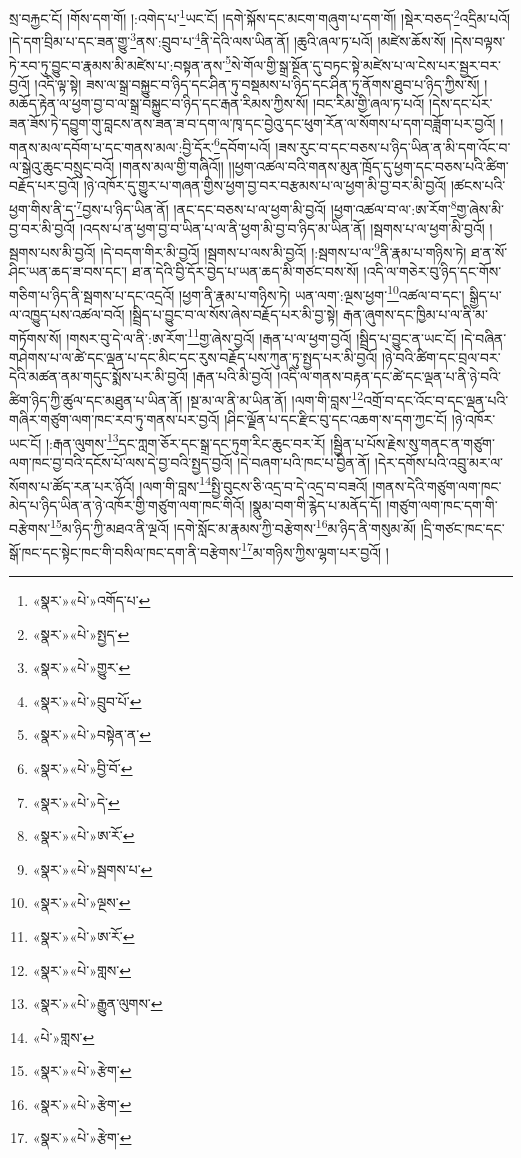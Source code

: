 སྲ་བརྐྱང་ངོ། །གོས་དག་གོ། །:འགེད་པ་\footnote{«སྣར་»«པེ་»འགོད་པ་}ཡང་ངོ། །དགེ་སྐོས་དང་མངག་གཞུག་པ་དག་གོ། །སྡེར་བཅད་\footnote{«སྣར་»«པེ་»སྤྱད་}འདྲིམ་པའོ། །དེ་དག་བྲིམ་པ་དང་ཟན་གྱུ་\footnote{«སྣར་»«པེ་»གྱུར་}ནས་:བྲུབ་པ་\footnote{«སྣར་»«པེ་»བྲུབ་པོ་}ནི་དེའི་ལས་ཡིན་ནོ། །ཆུའི་ཞལ་ཏ་པའོ། །མཛེས་ཆོས་སོ། །དེས་བལྟས་ཏེ་རབ་ཏུ་བྱུང་བ་རྣམས་མི་མཛེས་པ་:བསྟན་ནས་\footnote{«སྣར་»«པེ་»བསྟེན་ན་}སེ་གོལ་གྱི་སྒྲ་སྔོན་དུ་བཏང་སྟེ་མཛེས་པ་ལ་ངེས་པར་སྦྱར་བར་བྱའོ། །འདི་ལྟ་སྟེ། ཟས་ལ་སྒྲ་བསྐྱུང་བ་ཉིད་དང་ཤིན་ཏུ་བསྡམས་པ་ཉིད་དང་ཤིན་ཏུ་ནོགས་ཐུབ་པ་ཉིད་ཀྱིས་སོ། །མཆོད་རྟེན་ལ་ཕྱག་བྱ་བ་ལ་སྒྲ་བསྐྱུང་བ་ཉིད་དང་རྒན་རིམས་ཀྱིས་སོ། །བང་རིམ་གྱི་ཞལ་ཏ་པའོ། །དེས་དང་པོར་ཟན་ཟོས་ཏེ་དབྱུག་གུ་བླངས་ནས་ཟན་ཟ་བ་དག་ལ་ཁྭ་དང་བྱེའུ་དང་ཕུག་རོན་ལ་སོགས་པ་དག་བཟློག་པར་བྱའོ། །གནས་མལ་དབོག་པ་དང་གནས་མལ་:བྱི་དོར་\footnote{«སྣར་»«པེ་»བྱི་བོ་}དབོག་པའོ། །ཟས་རུང་བ་དང་བཅས་པ་ཉིད་ཡིན་ན་མི་དག་འོང་བ་ལ་སྒེའུ་ཆུང་བསྲུང་བའོ། །གནས་མལ་གྱི་གཞིའོ།། །།ཕྱག་འཚལ་བའི་གནས་མུན་ཁྲོད་དུ་ཕྱག་དང་བཅས་པའི་ཚིག་བརྗོད་པར་བྱའོ། །ཉེ་འཁོར་དུ་གྱུར་པ་གཞན་གྱིས་ཕྱག་བྱ་བར་བརྩམས་པ་ལ་ཕྱག་མི་བྱ་བར་མི་བྱའོ། །ཚངས་པའི་ཕྱག་གིས་ནི་ད་\footnote{«སྣར་»«པེ་»དེ་}བྱས་པ་ཉིད་ཡིན་ནོ། །ནང་དང་བཅས་པ་ལ་ཕྱག་མི་བྱའོ། །ཕྱག་འཚལ་བ་ལ་:ཨ་རོག་\footnote{«སྣར་»«པེ་»ཨ་རོ་}གྱ་ཞེས་མི་བྱ་བར་མི་བྱའོ། །འདས་པ་ན་ཕྱག་བྱ་བ་ཡིན་པ་ལ་ནི་ཕྱག་མི་བྱ་བ་ཉིད་མ་ཡིན་ནོ། །སྦགས་པ་ལ་ཕྱག་མི་བྱའོ། །སྦགས་པས་མི་བྱའོ། །དེ་བདག་གིར་མི་བྱའོ། །སྦགས་པ་ལས་མི་བྱའོ། །:སྦགས་པ་ལ་\footnote{«སྣར་»«པེ་»སྦགས་པ་}ནི་རྣམ་པ་གཉིས་ཏེ། ཐ་ན་སོ་ཤིང་ཡན་ཆད་ཟ་བས་དང་། ཐ་ན་དེའི་བྱི་དོར་བྱེད་པ་ཡན་ཆད་མི་གཙང་བས་སོ། །འདི་ལ་གཅེར་བུ་ཉིད་དང་གོས་གཅིག་པ་ཉིད་ནི་སྦགས་པ་དང་འདྲའོ། །ཕྱག་ནི་རྣམ་པ་གཉིས་ཏེ། ཡན་ལག་:ལྔས་ཕྱག་\footnote{«སྣར་»«པེ་»ལྔས་}འཚལ་བ་དང་། སྒྱིད་པ་ལ་འཁྱུད་པས་འཚལ་བའོ། །སྦྲིད་པ་བྱུང་བ་ལ་སོས་ཞེས་བརྗོད་པར་མི་བྱ་སྟེ། རྒན་ཞུགས་དང་ཁྱིམ་པ་ལ་ནི་མ་གཏོགས་སོ། །གསར་བུ་དེ་ལ་ནི་:ཨ་རོག་\footnote{«སྣར་»«པེ་»ཨ་རོ་}གྱ་ཞེས་བྱའོ། །རྒན་པ་ལ་ཕྱག་བྱའོ། །སྦྲིད་པ་བྱུང་ན་ཡང་ངོ། །དེ་བཞིན་གཤེགས་པ་ལ་ཚེ་དང་ལྡན་པ་དང་མིང་དང་རུས་བརྗོད་པས་ཀུན་ཏུ་སྤྱད་པར་མི་བྱའོ། །ཉེ་བའི་ཚིག་དང་བྲལ་བར་དེའི་མཚན་ནམ་གདུང་སྨོས་པར་མི་བྱའོ། །རྒན་པའི་མི་བྱའོ། །འདི་ལ་གནས་བརྟན་དང་ཚེ་དང་ལྡན་པ་ནི་ཉེ་བའི་ཚིག་ཉིད་ཀྱི་ཚུལ་དང་མཐུན་པ་ཡིན་ནོ། །སྔ་མ་ལ་ནི་མ་ཡིན་ནོ། །ལག་གི་བླས་\footnote{«སྣར་»«པེ་»གླས་}འགྲོ་བ་དང་འོང་བ་དང་ལྡན་པའི་གཞིར་གཙུག་ལག་ཁང་རབ་ཏུ་གནས་པར་བྱའོ། །ཤིང་ལྗོན་པ་དང་རྫིང་བུ་དང་འཆག་ས་དག་ཀྱང་ངོ། །ཉེ་འཁོར་ཡང་ངོ། །:རྒན་ལུགས་\footnote{«སྣར་»«པེ་»རྒྱུན་ལུགས་}དང་ཀླག་ཅོར་དང་སྒྲ་དང་ཏུག་རིང་ཆུང་བར་རོ། །སྦྱིན་པ་པོས་རྗེས་སུ་གནང་ན་གཙུག་ལག་ཁང་བྱ་བའི་དངོས་པོ་ལས་དེ་བྱ་བའི་སྤྱད་བྱའོ། །དེ་བཞག་པའི་ཁང་པ་བྱིན་ནོ། །དེར་དགོས་པའི་འབྲུ་མར་ལ་སོགས་པ་ཚོད་རན་པར་ཉོའོ། །ལག་གི་བླས་\footnote{«པེ་»གླས་}སྤྱི་བུངས་ཅི་འདྲ་བ་དེ་འདྲ་བ་བཟའོ། །གནས་དེའི་གཙུག་ལག་ཁང་མེད་པ་ཉིད་ཡིན་ན་ཉེ་འཁོར་གྱི་གཙུག་ལག་ཁང་གིའོ། །སྣུམ་བག་གི་རྙེད་པ་མནོད་དོ། །གཙུག་ལག་ཁང་དག་གི་བརྩེགས་\footnote{«སྣར་»«པེ་»རྩེག་}མ་ཉིད་ཀྱི་མཐའ་ནི་ལྔའོ། །དགེ་སློང་མ་རྣམས་ཀྱི་བརྩེགས་\footnote{«སྣར་»«པེ་»རྩེག་}མ་ཉིད་ནི་གསུམ་མོ། །དྲི་གཙང་ཁང་དང་སྒོ་ཁང་དང་སྟེང་ཁང་གི་བསིལ་ཁང་དག་ནི་བརྩེགས་\footnote{«སྣར་»«པེ་»རྩེག་}མ་གཉིས་ཀྱིས་ལྷག་པར་བྱའོ། །
